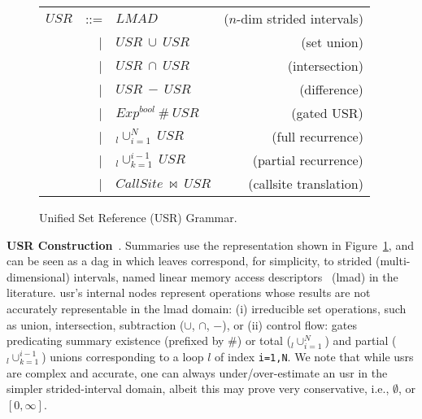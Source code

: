 \documentclass{sig-alternate}
\begin{document}

\begin{figure}[hbt]
\hspace{-4ex}
\begin{tabular}{lclr}
$USR$ & ::= &  $LMAD$                 & ($n$-dim strided intervals)\\
      & {\tt~~}| & $USR \ \cup \ USR$ & (set union)\\
      & {\tt~~}| & $USR \ \cap \ USR$ & (intersection)\\
      & {\tt~~}| & $USR \ - \ USR$ & (difference)\\
      & {\tt~~}| & $Exp^{bool} \ \# \ USR$ & (gated USR)\\
      & {\tt~~}| & $_l\cup_{i=1}^{N} \ USR$ & (full recurrence)\\
      & {\tt~~}| & $_l\cup_{k=1}^{i-1} \ USR$ & (partial recurrence)\\
      & {\tt~~}| & $CallSite \ \bowtie \ USR$ & (callsite translation)
\end{tabular}%
\caption{Unified Set Reference (USR) Grammar.}
\label{fig:USRgrammar}
\end{figure}

{\bf USR Construction}~\cite{HybAn}.
%
Summaries use the representation shown in Figure~\ref{fig:USRgrammar},
and can be seen as a {\sc dag} in which leaves correspond,
for simplicity, to strided (multi-dimensional) intervals, 
named linear memory access descriptors~\cite{LMAD} ({\sc lmad}) in the literature.
{\sc usr}'s internal nodes represent operations whose results are not
accurately representable in the {\sc lmad} domain: (i) irreducible set
operations, such as union, intersection, subtraction ($\cup$, $\cap$, $-$), 
or (ii) control flow: gates predicating
summary existence (prefixed by $\#$) or total ($_l\cup_{i=1}^N$) and partial 
($_l\cup_{k=1}^{i-1}$) unions corresponding to a loop $l$ of
index {\tt i=1,N}. 
%
We note that while {\sc usr}s are complex and accurate,
one can always under/over-estimate an {\sc usr} in the 
simpler strided-interval domain, albeit this may 
prove very conservative, i.e., $\emptyset$, or $[0,\infty]$. 
\end{document}
